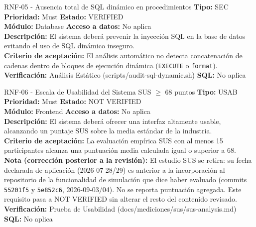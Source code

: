 \documentclass[11pt,a4paper]{article}
\begin{document}
\begin{requisito}{RNF-05 - Ausencia total de SQL dinámico en procedimientos}
    \textbf{Tipo:} SEC \quad \textbf{Prioridad:} Must \quad \textbf{Estado:} VERIFIED \\[0.2cm]
    \textbf{Módulo:} Database \quad \textbf{Acceso a datos:} No aplica \\[0.2cm]
    \textbf{Descripción:} El sistema deberá prevenir la inyección SQL en la base de datos evitando el uso de SQL dinámico inseguro. \\[0.2cm]
    \textbf{Criterio de aceptación:} El análisis automático no detecta concatenación de cadenas dentro de bloques de ejecución dinámica (\texttt{EXECUTE} o \texttt{format}). \\[0.2cm]
    \textbf{Verificación:} Análisis Estático (scripts/audit-sql-dynamic.sh) \quad \textbf{SQL:} No aplica
\end{requisito}

\begin{requisito}{RNF-06 - Escala de Usabilidad del Sistema SUS $\ge$ 68 puntos}
    \textbf{Tipo:} USAB \quad \textbf{Prioridad:} Must \quad \textbf{Estado:} NOT VERIFIED \\[0.2cm]
    \textbf{Módulo:} Frontend \quad \textbf{Acceso a datos:} No aplica \\[0.2cm]
    \textbf{Descripción:} El sistema deberá ofrecer una interfaz altamente usable, alcanzando un puntaje SUS sobre la media estándar de la industria. \\[0.2cm]
    \textbf{Criterio de aceptación:} La evaluación empírica SUS con al menos 15 participantes alcanza una puntuación media calculada igual o superior a 68. \\[0.2cm]
    \textbf{Nota (corrección posterior a la revisión):} El estudio SUS se retira: su fecha declarada de aplicación (2026-07-28/29) es anterior a la incorporación al repositorio de la funcionalidad de simulación que dice haber evaluado (commits \texttt{55201f5} y \texttt{5e852c6}, 2026-09-03/04). No se reporta puntuación agregada. Este requisito pasa a NOT VERIFIED sin alterar el resto del contenido revisado. \\[0.2cm]
    \textbf{Verificación:} Prueba de Usabilidad (docs/mediciones/sus/sus-analysis.md) \quad \textbf{SQL:} No aplica
\end{requisito}
\end{document}

